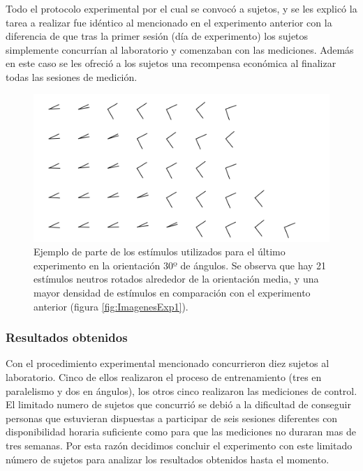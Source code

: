 \documentclass{article}
\begin{document}
    Todo el protocolo experimental por el cual se convocó a sujetos, y se les explicó la tarea a realizar fue idéntico al mencionado en el experimento anterior con la diferencia de que tras la primer sesión (día de experimento) los sujetos simplemente concurrían al laboratorio y comenzaban con las mediciones. Además en este caso se les ofreció a los sujetos una recompensa económica al finalizar todas las sesiones de medición.
    
    \begin{figure}
        \center
        \includegraphics[width=\textwidth]{Imagenes/ImagenesExp2.png}
        \caption{Ejemplo de parte de los estímulos utilizados para el último experimento en la orientación 30º de ángulos. Se observa que hay 21 estímulos neutros rotados alrededor de la orientación media, y una mayor densidad de estímulos en comparación con el experimento anterior (figura \ref{fig:ImagenesExp1}).}
        \label{fig:ImagenesExp2}
    \end{figure}  
    
    \subsubsection{Resultados obtenidos}
    
    Con el procedimiento experimental mencionado concurrieron diez sujetos al laboratorio. Cinco de ellos realizaron el proceso de entrenamiento (tres en paralelismo y dos en ángulos), los otros cinco realizaron las mediciones de control. El limitado numero de sujetos que concurrió se debió a la dificultad de conseguir personas que estuvieran dispuestas a participar de seis sesiones diferentes con disponibilidad horaria suficiente como para que las mediciones no duraran mas de tres semanas. Por esta razón decidimos concluir el experimento con este limitado número de sujetos para analizar los resultados obtenidos hasta el momento.   
    
\end{document}
